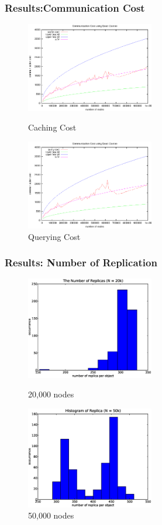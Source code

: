 \documentclass[red]{beamer}
\begin{document}
\begin{frame}
\frametitle{Results:Communication Cost}
\begin{figure}
\begin{minipage}{5cm}
\centering
\includegraphics[width=2.2in]{figs/cache_cost_fit.eps}
\caption{Caching Cost} 
\end{minipage}
\begin{minipage}{5cm}
\centering
\includegraphics[width=2.2in]{figs/query_cost_fit.eps}
\caption{Querying Cost}
\end{minipage}
\end{figure}
\end{frame}

\begin{frame}
\frametitle{Results: Number of Replication}
\begin{figure}
\begin{minipage}{5cm}
\centering
\includegraphics[width=2.2in]{figs/rep_obj_20k.eps}
\caption{20,000 nodes} 
\end{minipage}
\begin{minipage}{5cm}
\centering
\includegraphics[width=2.2in]{figs/rep_obj_50k.eps}
\caption{50,000 nodes}
\end{minipage}
\end{figure}
\end{frame}
\end{document}
